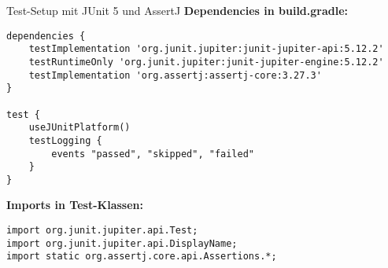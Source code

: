 \begin{frame}[fragile]{Test-Setup mit JUnit 5 und AssertJ}
  \textbf{Dependencies in build.gradle:}

  \begin{lstlisting}[style=java, basicstyle=\tiny\ttfamily, language={}]
dependencies {
    testImplementation 'org.junit.jupiter:junit-jupiter-api:5.12.2'
    testRuntimeOnly 'org.junit.jupiter:junit-jupiter-engine:5.12.2'
    testImplementation 'org.assertj:assertj-core:3.27.3'
}

test {
    useJUnitPlatform()
    testLogging {
        events "passed", "skipped", "failed"
    }
}
  \end{lstlisting}

  \textbf{Imports in Test-Klassen:}
  \begin{lstlisting}[style=java, basicstyle=\footnotesize\ttfamily]
import org.junit.jupiter.api.Test;
import org.junit.jupiter.api.DisplayName;
import static org.assertj.core.api.Assertions.*;
  \end{lstlisting}
\end{frame}


